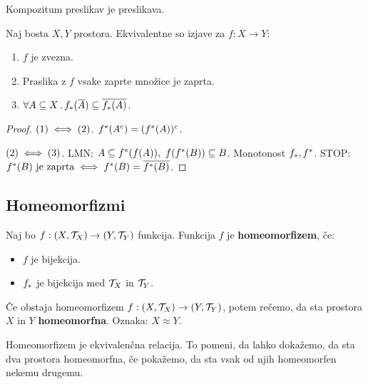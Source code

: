 \begin{trditev}
    Kompozitum preslikav je preslikava.
\end{trditev}

\newpage
\begin{trditev}
    Naj bosta $X, Y$ prostora. Ekvivalentne so izjave za $f: X \to Y$:
    \begin{enumerate}
        \item $f$ je zvezna.
        \item Praslika z $f$ vsake zaprte množice je zaprta.
        \item $\forall A \subseteq X \,.\, f_{*}(\overline{A}) \subseteq \overline{f_{*}(A)}$.
    \end{enumerate}
\end{trditev}

\begin{proof}
    $(1) \iff (2)$. $f^{*}(A^c) = (f^{*}(A))^c$.

    $(2) \iff (3)$. LMN: $A \subseteq f^{*}(f(A)), \ f(f^{*}(B)) \subseteq B$. Monotonost $f_{*}, f^{*}$. STOP:
    $f^{*}(B) \text{ je zaprta} \iff f^{*}(B) = \overline{f^{*}(B)}$.
\end{proof}

\subsection{Homeomorfizmi}
\begin{definicija}
    Naj bo $f: (X, \mathcal{T}_X) \to (Y, \mathcal{T}_Y)$ funkcija. Funkcija $f$ je \textbf{homeomorfizem}, če:
    \begin{itemize}
        \item $f$ je bijekcija.
        \item $f_{*}$ je bijekcija med $\mathcal{T}_X$ in $\mathcal{T}_Y$.
    \end{itemize}
\end{definicija}

\begin{definicija}
    Če obstaja homeomorfizem $f: (X, \mathcal{T}_X) \to (Y, \mathcal{T}_Y)$, potem rečemo, da sta prostora $X$ in $Y$ \textbf{homeomorfna}. Oznaka: $X \approx  Y$.
\end{definicija}

\begin{opomba}
    Homeomorfizem je ekvivalenčna relacija. To pomeni, da lahko dokažemo, da sta dva prostora homeomorfna, če pokažemo, da sta vsak od njih homeomorfen nekemu drugemu.
\end{opomba}

